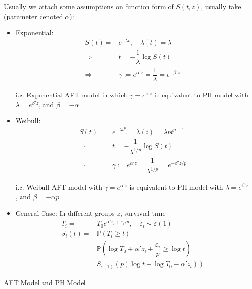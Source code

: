     Usually we attach some assumptions on function form of $ S(t,z) $, usually take (parameter denoted $ \alpha  $):
\begin{itemize}[topsep=2pt,itemsep=0pt]
    \item Exponential:
    \begin{align}
        S(t)=&e^{-\lambda t},\quad \lambda (t)=\lambda \\
        \Rightarrow &t=-\dfrac{1}{\lambda }\log S(t)\\
        \Rightarrow &\gamma :=e^{\alpha 'z}=\dfrac{1}{\lambda }=e^{-\beta 'z}
    \end{align}

    i.e. Exponential AFT model in which $ \gamma =e^{\alpha 'z} $ is equivalent to PH model with $ \lambda =e^{\beta 'z} $, and $ \beta =-\alpha  $ 
    
    \item Weibull:
    \begin{align}
        S(t)=&e^{-\lambda t^p},\quad \lambda (t)=\lambda pt^{p-1}\\
        \Rightarrow &t=-\dfrac{1}{\lambda ^{1/p}}\log S(t)\\
        \Rightarrow &\gamma :=e^{\alpha 'z}=\dfrac{1}{\lambda ^{1/p}}=e^{-\beta 'z/p}
    \end{align}
    
    i.e. Weibull AFT model with $ \gamma =e^{\alpha 'z} $ is equivalent to PH model with $ \lambda =e^{\beta 'z} $, and $ \beta =-\alpha p $
    
    \item General Case: In different groups $ z $, survivial time 
    \begin{align}
        T_i=&T_0e^{\alpha 'z_i+ \varepsilon _i/p },\quad \varepsilon _i\sim \varepsilon (1)\\
        S_i(t)=&\mathbb{P}\left( T_i\geq t \right)\\
        =&\mathbb{P}\left( \log T_0 +\alpha 'z_i+\dfrac{\varepsilon _i}{p}\geq  \log t \right)  \\
        =&S_{\varepsilon (1)}\left(p({\log t-\log T_0-\alpha 'z_i})\right)
    \end{align}
    
    
    
    
\end{itemize}


\begin{point}
    AFT Model and PH Model
\end{point}

